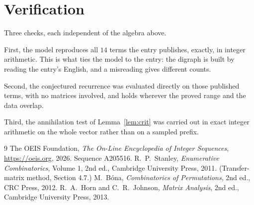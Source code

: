 \documentclass[11pt,a4paper]{article}
\theoremstyle{plain}
\theoremstyle{definition}
\begin{document}
\section{Verification}

Three checks, each independent of the algebra above.

First, the model reproduces all $14$ terms the entry publishes, exactly, in integer
arithmetic. This is what ties the model to the entry: the digraph is built by reading the
entry's English, and a misreading gives different counts.

Second, the conjectured recurrence was evaluated directly on those published terms, with no
matrices involved, and holds wherever the proved range and the data overlap.

Third, the annihilation test of Lemma~\ref{lem:crit} was carried out in exact integer
arithmetic on the whole vector rather than on a sampled prefix.

\begin{thebibliography}{9}
 The OEIS Foundation, \emph{The On-Line Encyclopedia of Integer
Sequences}, \url{https://oeis.org}, 2026. Sequence A205516.
 R.~P.~Stanley, \emph{Enumerative Combinatorics}, Volume 1, 2nd ed.,
Cambridge University Press, 2011. (Transfer-matrix method, Section 4.7.)
 M.~B\'ona, \emph{Combinatorics of Permutations}, 2nd ed., CRC
Press, 2012.
 R.~A.~Horn and C.~R.~Johnson, \emph{Matrix Analysis}, 2nd ed., Cambridge
University Press, 2013.
\end{thebibliography}
\end{document}
